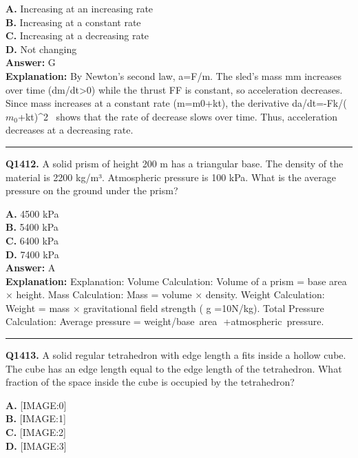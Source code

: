 \documentclass[12pt]{article}
\begin{document}
\textbf{A.} Increasing at an increasing rate \\
\textbf{B.} Increasing at a constant rate \\
\textbf{C.} Increasing at a decreasing rate \\
\textbf{D.} Not changing \\

\textbf{Answer:} G \\
\textbf{Explanation:} By Newton's second law, a=F/m. The sled's mass mm increases over time (dm/dt>0) while the thrust FF is constant, so acceleration decreases. Since mass increases at a constant rate (m=m0+kt), the derivative da/dt=-Fk/($m_0$+kt)^2  shows that the rate of decrease slows over time. Thus, acceleration decreases at a decreasing rate.

\hrule
\vspace{1em}


\noindent
\textbf{Q1412.} A solid prism of height 200 m has a triangular base. The density of the material is 2200 kg/m³. Atmospheric pressure is 100 kPa. What is the average pressure on the ground under the prism?



\textbf{A.} 4500 kPa \\
\textbf{B.} 5400 kPa \\
\textbf{C.} 6400 kPa \\
\textbf{D.} 7400 kPa \\

\textbf{Answer:} A \\
\textbf{Explanation:} Explanation:
Volume Calculation: Volume of a prism = base area × height.
Mass Calculation: Mass = volume × density.
Weight Calculation: Weight = mass × gravitational field strength (
g
=10N/kg).
Total Pressure Calculation: Average pressure = weight/base area
​
+atmospheric pressure.

\hrule
\vspace{1em}


\noindent
\textbf{Q1413.} A solid regular tetrahedron with edge length a
fits inside a hollow cube. The cube has an edge length equal to the edge length of the tetrahedron. What fraction of the space inside the cube is occupied by the tetrahedron?



\textbf{A.} [IMAGE:0] \\
\textbf{B.} [IMAGE:1] \\
\textbf{C.} [IMAGE:2] \\
\textbf{D.} [IMAGE:3] \\
\end{document}
